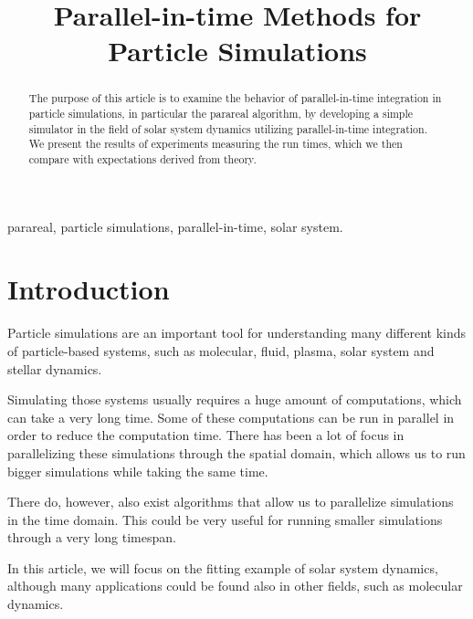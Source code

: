 \documentclass[conference]{IEEEtran}
\begin{document}
\title{Parallel-in-time Methods for Particle Simulations}

\author{
}

\maketitle

\begin{abstract}
The purpose of this article is to examine the behavior of parallel-in-time integration in particle simulations, in particular the parareal algorithm, by developing a simple simulator in the field of solar system dynamics utilizing parallel-in-time integration. We present the results of experiments measuring the run times, which we then compare with expectations derived from theory.
\end{abstract}

\begin{IEEEkeywords}
parareal, particle simulations, parallel-in-time, solar system.
\end{IEEEkeywords}

\section{Introduction}

Particle simulations are an important tool for understanding many different kinds of particle-based systems, such as molecular, fluid, plasma, solar system and stellar dynamics.

Simulating those systems usually requires a huge amount of computations, which can take a very long time. Some of these computations can be run in parallel in order to reduce the computation time. There has been a lot of focus in parallelizing these simulations through the spatial domain, which allows us to run bigger simulations while taking the same time.

There do, however, also exist algorithms that allow us to parallelize simulations in the time domain. This could be very useful for running smaller simulations through a very long timespan. 

In this article, we will focus on the fitting example of solar system dynamics, although many applications could be found also in other fields, such as molecular dynamics\cite{moldyn}.
\end{document}
